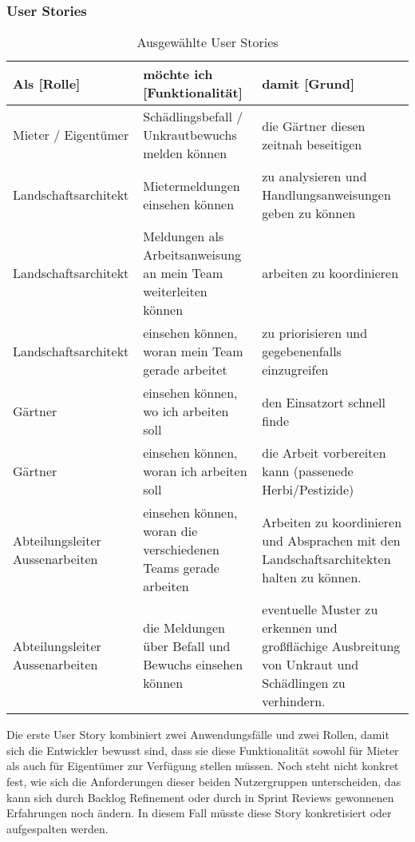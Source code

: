 \subsubsection{User Stories}
\label{subsec:userStories}
\begin{table}[ht]
    \centering
    \begin{tabularx}{\textwidth}{|X|X|X|} 
        \hline
        Als [Rolle] & möchte ich [Funktionalität] & damit [Grund]\\
        \hline
        Mieter / Eigentümer & Schädlingsbefall / Unkrautbewuchs melden können & die Gärtner diesen zeitnah beseitigen\\
        \hline
        Landschaftsarchitekt & Mietermeldungen einsehen können & zu analysieren und Handlungsanweisungen geben zu können\\
        \hline
        Landschaftsarchitekt & Meldungen als Arbeitsanweisung an mein Team weiterleiten können & arbeiten zu koordinieren\\
        \hline
        Landschaftsarchitekt & einsehen können, woran mein Team gerade arbeitet & zu priorisieren und gegebenenfalls einzugreifen\\
        \hline
        Gärtner & einsehen können, wo ich arbeiten soll & den Einsatzort schnell finde \\
        \hline
        Gärtner & einsehen können, woran ich arbeiten soll & die Arbeit vorbereiten kann (passenede Herbi/Pestizide) \\
        \hline
        Abteilungsleiter Aussenarbeiten& einsehen können, woran die verschiedenen Teams gerade arbeiten & Arbeiten zu koordinieren und Absprachen mit den Landschaftsarchitekten halten zu können.\\
        \hline
        Abteilungsleiter Aussenarbeiten& die Meldungen über Befall und Bewuchs einsehen können & eventuelle Muster zu erkennen und großflächige Ausbreitung von Unkraut und Schädlingen zu verhindern.\\
        \hline
    \end{tabularx}
    \caption{Ausgewählte User Stories}
    \label{tab:userStories}
\end{table}

Die erste User Story kombiniert zwei Anwendungsfälle und zwei Rollen, damit sich die Entwickler bewusst sind, dass sie diese Funktionalität sowohl für Mieter als auch für Eigentümer zur Verfügung stellen müssen. Noch steht nicht konkret fest, wie sich die Anforderungen dieser beiden Nutzergruppen unterscheiden, das kann sich durch Backlog Refinement oder durch in Sprint Reviews gewonnenen Erfahrungen noch ändern. In diesem Fall müsste diese Story konkretisiert oder aufgespalten werden.\\

